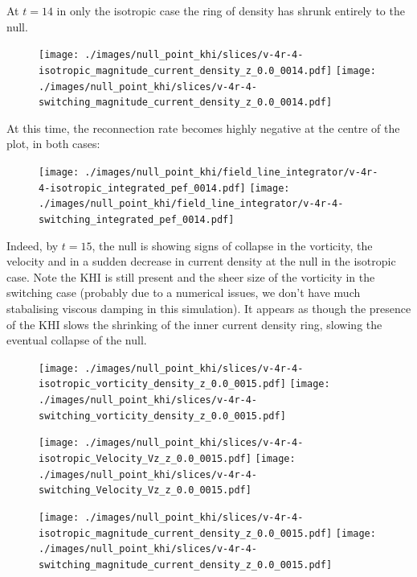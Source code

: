 At $t=14$ in only the isotropic case the ring of density has shrunk entirely to the null.

\begin{figure}[H]
  \centering
  \texttt{[image: ./images/null\_point\_khi/slices/v-4r-4-isotropic\_magnitude\_current\_density\_z\_0.0\_0014.pdf]}
  \texttt{[image: ./images/null\_point\_khi/slices/v-4r-4-switching\_magnitude\_current\_density\_z\_0.0\_0014.pdf]}
\end{figure}

At this time, the reconnection rate becomes highly negative at the centre of the plot, in both cases:

\begin{figure}[H]
  \centering
  \texttt{[image: ./images/null\_point\_khi/field\_line\_integrator/v-4r-4-isotropic\_integrated\_pef\_0014.pdf]}
  \texttt{[image: ./images/null\_point\_khi/field\_line\_integrator/v-4r-4-switching\_integrated\_pef\_0014.pdf]}
\end{figure}

Indeed, by $t=15$, the null is showing signs of collapse in the vorticity, the velocity and in a sudden decrease in current density at the null in the isotropic case.  Note the KHI is still present and the sheer size of the vorticity in the switching case (probably due to a numerical issues, we don't have much stabalising viscous damping in this simulation). It appears as though the presence of the KHI slows the shrinking of the inner current density ring, slowing the eventual collapse of the null.

\begin{figure}[H]
  \centering
  \texttt{[image: ./images/null\_point\_khi/slices/v-4r-4-isotropic\_vorticity\_density\_z\_0.0\_0015.pdf]}
  \texttt{[image: ./images/null\_point\_khi/slices/v-4r-4-switching\_vorticity\_density\_z\_0.0\_0015.pdf]}
\end{figure}

\begin{figure}[H]
  \centering
  \texttt{[image: ./images/null\_point\_khi/slices/v-4r-4-isotropic\_Velocity\_Vz\_z\_0.0\_0015.pdf]}
  \texttt{[image: ./images/null\_point\_khi/slices/v-4r-4-switching\_Velocity\_Vz\_z\_0.0\_0015.pdf]}
\end{figure}

\begin{figure}[H]
  \centering
  \texttt{[image: ./images/null\_point\_khi/slices/v-4r-4-isotropic\_magnitude\_current\_density\_z\_0.0\_0015.pdf]}
  \texttt{[image: ./images/null\_point\_khi/slices/v-4r-4-switching\_magnitude\_current\_density\_z\_0.0\_0015.pdf]}
\end{figure}

